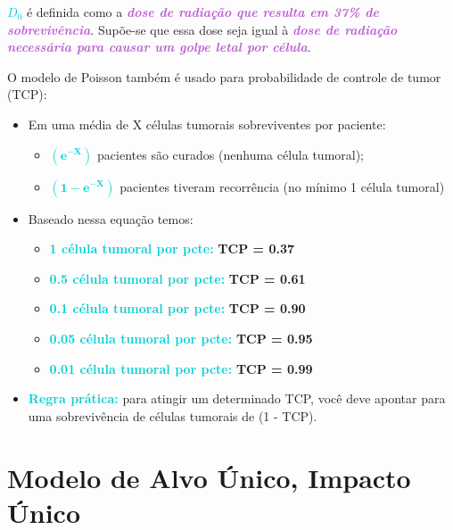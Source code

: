 \documentclass[11pt,a4paper]{article}
\begin{document}
	\textcolor{DarkTurquoise}{\textbf{\textit{$D_0$}}} é definida como a \textcolor{MediumOrchid}{\textbf{\textit{dose de radiação que resulta em 37\% de sobrevivência}}}. Supõe-se que essa dose seja igual à \textcolor{MediumOrchid}{\textbf{\textit{dose de radiação necessária para causar um golpe letal por célula}}}.
	
	O modelo de Poisson também é usado para probabilidade de controle de tumor (TCP):

	\begin{itemize}
		\item Em uma média de X células tumorais sobreviventes por paciente:
		\begin{itemize}[label=\textcolor{CarnationPink}{$\star$}]
			\item \textcolor{DarkTurquoise}{\textbf{$\mathbf{\left(e^{-X}\right)}$}}  pacientes são curados (nenhuma célula tumoral);
			\item \textcolor{DarkTurquoise}{\textbf{$\mathbf{\left(1 - e^{-X}\right)}$}} pacientes tiveram recorrência (no mínimo 1 célula tumoral)
		\end{itemize}

		\item Baseado nessa equação temos:
		\begin{itemize}[label=\textcolor{CarnationPink}{$\star$}]
			\item \textcolor{DarkTurquoise}{\textbf{1 célula tumoral por pcte:}} \textbf{TCP = 0.37}
			\item \textcolor{DarkTurquoise}{\textbf{0.5 célula tumoral por pcte:}} \textbf{TCP = 0.61}
			\item \textcolor{DarkTurquoise}{\textbf{0.1 célula tumoral por pcte:}} \textbf{TCP = 0.90}
			\item \textcolor{DarkTurquoise}{\textbf{0.05 célula tumoral por pcte:}} \textbf{TCP = 0.95}
			\item \textcolor{DarkTurquoise}{\textbf{0.01 célula tumoral por pcte:}} \textbf{TCP = 0.99}
		\end{itemize}
		\item \textcolor{DarkTurquoise}{\textbf{Regra prática:}} para atingir um determinado TCP, você deve apontar para uma sobrevivência de células tumorais de (1 - TCP).
	\end{itemize}

\section{Modelo de Alvo Único, Impacto Único}
\end{document}
